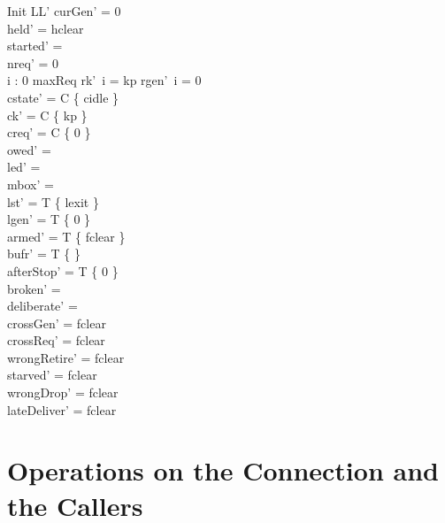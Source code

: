 \documentclass[a4paper,10pt,fleqn]{article}
\begin{document}
\begin{schema}{Init}
  LL'
\where
  curGen' = 0 \\
  held' = hclear \\
  started' = \emptyset \\
  nreq' = 0 \\
  \forall i : 0 \upto maxReq \spot rk'~i = kp \land rgen'~i = 0 \\
  cstate' = C \cross \{ cidle \} \\
  ck' = C \cross \{ kp \} \\
  creq' = C \cross \{ 0 \} \\
  owed' = \emptyset \\
  led' = \emptyset \\
  mbox' = \emptyset \\
  lst' = T \cross \{ lexit \} \\
  lgen' = T \cross \{ 0 \} \\
  armed' = T \cross \{ fclear \} \\
  bufr' = T \cross \{ \emptyset \} \\
  afterStop' = T \cross \{ 0 \} \\
  broken' = \emptyset \\
  deliberate' = \emptyset \\
  crossGen' = fclear \\
  crossReq' = fclear \\
  wrongRetire' = fclear \\
  starved' = fclear \\
  wrongDrop' = fclear \\
  lateDeliver' = fclear
\end{schema}

\section{Operations on the Connection and the Callers}
\end{document}
